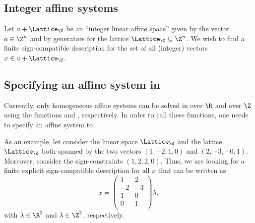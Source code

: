 \subsection{Integer affine systems}

Let $a+\Lattice_{\Z}$ be an ``integer linear affine space'' given by
the vector $a\in\Z^n$ and by generators for the lattice
$\Lattice_{\Z}\subseteq\Z^n$. We wish to find a finite
sign-compatible description for the set of all (integer) vectors
$x\in a+\Lattice_{\Z}$.

\subsection{Specifying an affine system in \FourTiTwo{}}

Currently, only homogeneous affine systems can be solved in
\FourTiTwo{} over $\R$ and over $\Z$ using the functions
 and , respectively. In order to call
these functions, one needs to specify an affine system to
\FourTiTwo.

As an example, let consider the linear space $\Lattice_{\R}$ and the
lattice $\Lattice_{\Z}$ both spanned by the two vectors $(1,-2,1,0)$
and $(2,-3,-0,1)$. Moreover, consider the sign-constraints
$(1,2,2,0)$. Thus, we are looking for a finite explicit
sign-compatible description for all $x$ that can be written as
\[
x=\left(
\begin{array}{rr}
1 & 2\\
-2 & -3\\
1 & 0\\
0 & 1\\
\end{array}
\right)\lambda,
\]
with $\lambda\in\R^2$ and $\lambda\in\Z^2$, respectively.

